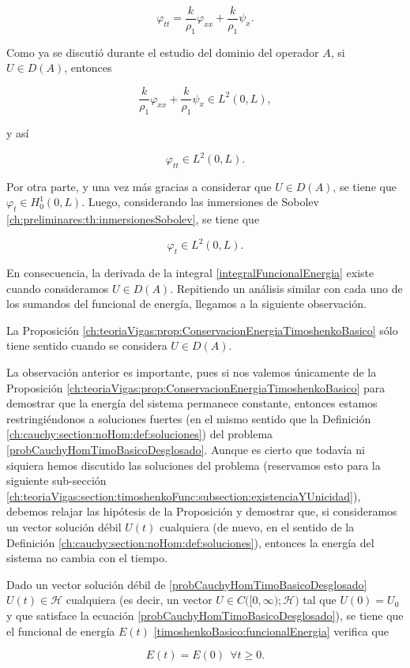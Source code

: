 \[\varphi_{tt} = \frac{k}{\rho_1}\varphi_{xx} + \frac{k}{\rho_1}\psi_x.\]

Como ya se discutió durante el estudio del dominio del operador $A$, si $U \in D(A)$, entonces

\[\frac{k}{\rho_1}\varphi_{xx} + \frac{k}{\rho_1}\psi_x \in L^2(0,L),\]

y así

\[\varphi_{tt} \in L^2(0,L).\]

Por otra parte, y una vez más gracias a considerar que $U \in D(A)$, se tiene que $\varphi_t \in H_0^1(0,L)$. Luego, considerando las inmersiones de Sobolev \ref{ch:preliminares:th:inmersionesSobolev}, se tiene que 

\[\varphi_t \in L^2(0,L).\]

En consecuencia, la derivada de la integral \eqref{integralFuncionalEnergia} existe cuando consideramos $U \in D(A)$. Repitiendo un análisis similar con cada uno de los sumandos del funcional de energía, llegamos a la siguiente observación.\\

\begin{Observacion}
    \label{ch:teoriaVigas:obs:CondicionDerivadaFuncEnergia}
    
    La Proposición \ref{ch:teoriaVigas:prop:ConservacionEnergiaTimoshenkoBasico} sólo tiene sentido cuando se considera $U \in D(A)$.
\end{Observacion}

La observación anterior es importante, pues si nos valemos únicamente de la Proposición \ref{ch:teoriaVigas:prop:ConservacionEnergiaTimoshenkoBasico} para demostrar que la energía del sistema permanece constante, entonces estamos restringiéndonos a soluciones fuertes (en el mismo sentido que la Definición \ref{ch:cauchy:section:noHom:def:soluciones}) del problema \ref{probCauchyHomTimoBasicoDesglosado}. Aunque es cierto que todavía ni siquiera hemos discutido las soluciones del problema (reservamos esto para la siguiente sub-sección \ref{ch:teoriaVigas:section:timoshenkoFunc:subsection:existenciaYUnicidad}), debemos relajar las hipótesis de la Proposición y demostrar que, si consideramos un vector solución débil $U(t)$ cualquiera (de nuevo, en el sentido de la Definición \ref{ch:cauchy:section:noHom:def:soluciones}), entonces la energía del sistema no cambia con el tiempo.\\

\begin{Proposicion}
\label{ch:teoriaVigas:prop:ConservacionEnergiaTimoshenkoBasicoRelajado}

    Dado un vector solución débil de \eqref{probCauchyHomTimoBasicoDesglosado} $U(t) \in \mathcal{H}$ cualquiera (es decir, un vector $U \in C\big([0, \infty); \mathcal{H} \big)$ tal que $U(0) = U_0$ y que satisface la ecuación \eqref{probCauchyHomTimoBasicoDesglosado}), se tiene que el funcional de energía $E(t)$ \eqref{timoshenkoBasico:funcionalEnergia} verifica que

    \[E(t) = E(0) \ \  \forall t \geq 0.\]
\end{Proposicion}

